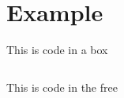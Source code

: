\documentclass{ituhandin}
\begin{document}
\chapter{} %

\chapter*{Example}

This is code in a box

\begin{lstlisting}[caption=This is a caption]
\end{lstlisting}


This is code in the free

\begin{lstlisting}[frame={}]
\end{lstlisting}




\label{LastPage}
\end{document}
